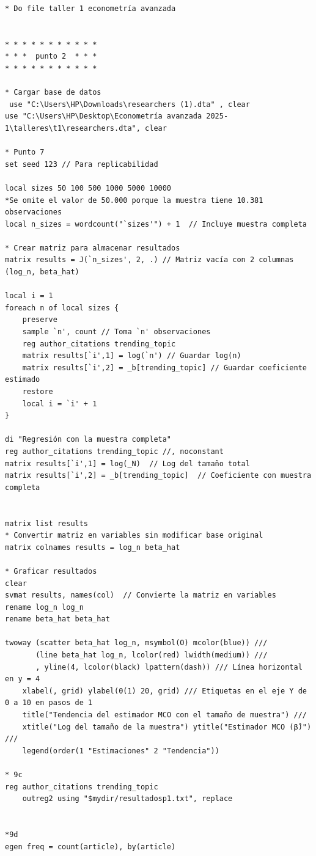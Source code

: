 \documentclass[a4paper, answers, addpoints, 11pt]{exam}
\begin{document}
\begin{verbatim}
* Do file taller 1 econometría avanzada


* * * * * * * * * * * 
* * *  punto 2  * * * 
* * * * * * * * * * * 

* Cargar base de datos
 use "C:\Users\HP\Downloads\researchers (1).dta" , clear
use "C:\Users\HP\Desktop\Econometría avanzada 2025-1\talleres\t1\researchers.dta", clear

* Punto 7
set seed 123 // Para replicabilidad

local sizes 50 100 500 1000 5000 10000 
*Se omite el valor de 50.000 porque la muestra tiene 10.381 observaciones
local n_sizes = wordcount("`sizes'") + 1  // Incluye muestra completa

* Crear matriz para almacenar resultados
matrix results = J(`n_sizes', 2, .) // Matriz vacía con 2 columnas (log_n, beta_hat)

local i = 1
foreach n of local sizes {
    preserve
    sample `n', count // Toma `n' observaciones
    reg author_citations trending_topic
    matrix results[`i',1] = log(`n') // Guardar log(n)
    matrix results[`i',2] = _b[trending_topic] // Guardar coeficiente estimado
    restore
    local i = `i' + 1
}

di "Regresión con la muestra completa"
reg author_citations trending_topic //, noconstant
matrix results[`i',1] = log(_N)  // Log del tamaño total
matrix results[`i',2] = _b[trending_topic]  // Coeficiente con muestra completa


matrix list results
* Convertir matriz en variables sin modificar base original
matrix colnames results = log_n beta_hat

* Graficar resultados
clear
svmat results, names(col)  // Convierte la matriz en variables
rename log_n log_n
rename beta_hat beta_hat

twoway (scatter beta_hat log_n, msymbol(O) mcolor(blue)) ///
       (line beta_hat log_n, lcolor(red) lwidth(medium)) ///
       , yline(4, lcolor(black) lpattern(dash)) /// Línea horizontal en y = 4
    xlabel(, grid) ylabel(0(1) 20, grid) /// Etiquetas en el eje Y de 0 a 10 en pasos de 1
    title("Tendencia del estimador MCO con el tamaño de muestra") ///
    xtitle("Log del tamaño de la muestra") ytitle("Estimador MCO (β̂)") ///
    legend(order(1 "Estimaciones" 2 "Tendencia")) 

* 9c
reg author_citations trending_topic 
	outreg2 using "$mydir/resultadosp1.txt", replace
	
	
*9d 
egen freq = count(article), by(article)


\end{verbatim}
\end{document}
